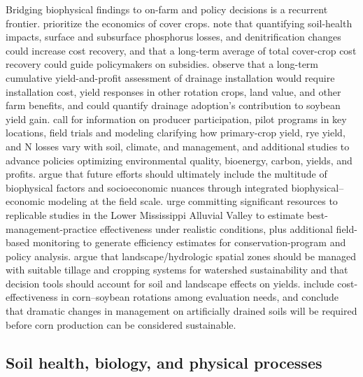 \documentclass[11pt]{article}
\begin{document}
Bridging biophysical findings to on-farm and policy decisions is a recurrent frontier. \textcite{Waring2020} prioritize the economics of cover crops. \textcite{Roth2018} note that quantifying soil-health impacts, surface and subsurface phosphorus losses, and denitrification changes could increase cost recovery, and that a long-term average of total cover-crop cost recovery could guide policymakers on subsidies. \textcite{Mourtzinis2021} observe that a long-term cumulative yield-and-profit assessment of drainage installation would require installation cost, yield responses in other rotation crops, land value, and other farm benefits, and could quantify drainage adoption's contribution to soybean yield gain. \textcite{Malone2023} call for information on producer participation, pilot programs in key locations, field trials and modeling clarifying how primary-crop yield, rye yield, and N losses vary with soil, climate, and management, and additional studies to advance policies optimizing environmental quality, bioenergy, carbon, yields, and profits. \textcite{Ferin2023} argue that future efforts should ultimately include the multitude of biophysical factors and socioeconomic nuances through integrated biophysical--economic modeling at the field scale. \textcite{Kröger2012} urge committing significant resources to replicable studies in the Lower Mississippi Alluvial Valley to estimate best-management-practice effectiveness under realistic conditions, plus additional field-based monitoring to generate efficiency estimates for conservation-program and policy analysis. \textcite{Bakhsh2007b} argue that landscape/hydrologic spatial zones should be managed with suitable tillage and cropping systems for watershed sustainability and that decision tools should account for soil and landscape effects on yields. \textcite{Nelson2011} include cost-effectiveness in corn--soybean rotations among evaluation needs, and \textcite{Jaynes2001} conclude that dramatic changes in management on artificially drained soils will be required before corn production can be considered sustainable.

\subsection{Soil health, biology, and physical processes}
\end{document}
